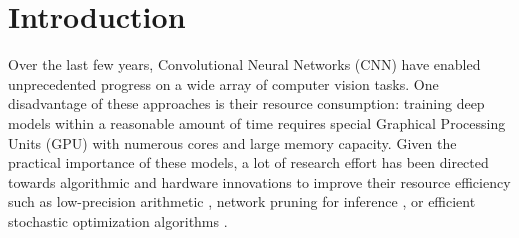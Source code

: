 \documentclass[twocolumn]{bmcart}
\begin{document}
\begin{frontmatter}
\begin{fmbox}
\begin{abstractbox}

\begin{keyword}
\end{keyword}


\end{abstractbox}
\end{fmbox}%
\end{frontmatter}





\section{Introduction}
Over the last few years, Convolutional Neural Networks (CNN) have enabled unprecedented progress on a wide array of computer vision tasks.
One disadvantage of these approaches is their resource consumption:
training deep models within a reasonable amount of time requires special
Graphical Processing Units (GPU) with numerous cores and large memory capacity.
Given the practical importance of these models, a lot of research effort has been directed
towards algorithmic and hardware innovations to improve their resource efficiency such as low-precision arithmetic \cite{jacob2018quantization}, network pruning for inference \cite{molchanov2016pruning}, or efficient stochastic optimization algorithms \cite{kingma2014adam}.
\end{document}
